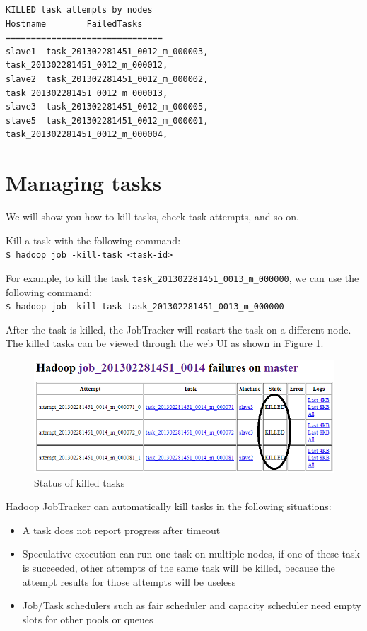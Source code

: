 \begin{lstlisting}
KILLED task attempts by nodes
Hostname        FailedTasks
===============================
slave1  task_201302281451_0012_m_000003, task_201302281451_0012_m_000012,
slave2  task_201302281451_0012_m_000002, task_201302281451_0012_m_000013,
slave3  task_201302281451_0012_m_000005,
slave5  task_201302281451_0012_m_000001, task_201302281451_0012_m_000004,
\end{lstlisting}

\section{Managing tasks}
We will show you how to kill tasks, check task attempts, and so on. 

Kill a task with the following command: \\
\verb|$ hadoop job -kill-task <task-id> |

For example, to kill the task \verb|task_201302281451_0013_m_000000|, we can use the following command: \\ 
\verb|$ hadoop job -kill-task task_201302281451_0013_m_000000|

After the task is killed, the JobTracker will restart the task on a different node. The killed tasks can be viewed through the web UI as shown in Figure \ref{fig:mapred.killed.tasks}.
\begin{figure}[h]
  \centering
  \includegraphics[width=\textwidth]{figs/5163os_04_14.png}
  \caption{Status of killed tasks}\label{fig:mapred.killed.tasks}
\end{figure} 

Hadoop JobTracker can automatically kill tasks in the following situations:
\begin{itemize}
  \item A task does not report progress after timeout
  \item Speculative execution can run one task on multiple nodes, if one of these task is succeeded, other attempts of the same task will be killed, because the attempt results for those attempts will be useless
  \item Job/Task schedulers such as fair scheduler and capacity scheduler need empty slots for other pools or queues
\end{itemize}

